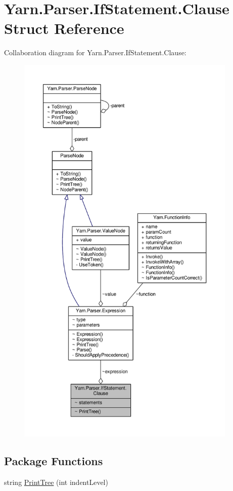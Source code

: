 \hypertarget{a00025}{\section{Yarn.\-Parser.\-If\-Statement.\-Clause Struct Reference}
\label{a00025}
}


Collaboration diagram for Yarn.\-Parser.\-If\-Statement.\-Clause\-:
\nopagebreak
\begin{figure}[H]
\begin{center}
\leavevmode
\includegraphics[height=550pt]{d9/dd6/a00272}
\end{center}
\end{figure}
\subsection*{Package Functions}
\begin{DoxyCompactItemize}
\item 
string \hyperlink{a00025_a7f4fc9399896512b68fdc7bc7cf818c9}{Print\-Tree} (int indent\-Level)
\end{DoxyCompactItemize}

